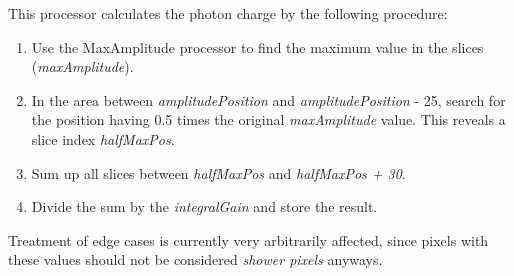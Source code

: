 This processor calculates the photon charge by the following procedure:
\begin{enumerate}
\item Use the {\ttfamily MaxAmplitude} processor to find the maximum
  value in the slices ({\em maxAmplitude}).
\item In the area between {\em amplitudePosition} and {\em
    amplitudePosition} - 25, search for the position having 0.5 times
  the original {\em maxAmplitude} value. This reveals a slice index
  {\em halfMaxPos}.
\item Sum up all slices between {\em halfMaxPos} and {\em halfMaxPos +
    30}.
\item Divide the sum by the {\em integralGain} and store the result.
\end{enumerate}
Treatment of edge cases is currently very arbitrarily affected, since
pixels with these values should not be considered {\em shower pixels}
anyways.
